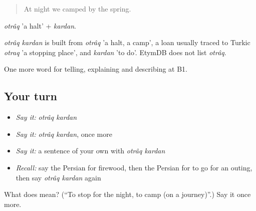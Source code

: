 \begin{quote}
At night we camped by the spring.
\end{quote}

\emph{otrâq} 'a halt' + \emph{kardan}.

\begin{cousinweb}
\emph{otrâq kardan} is built from \emph{otrâq} 'a halt, a camp', a loan usually traced to Turkic \emph{otraq} 'a stopping place', and \emph{kardan} 'to do'. EtymDB does not list \emph{otrâq}.
\end{cousinweb}

\begin{grammarlens}[title={What you've built}]
One more word for telling, explaining and describing at B1.
\end{grammarlens}

\subsection*{Your turn}
\begin{itemize}
\raggedright
  \item \emph{Say it:} \emph{otrâq kardan}
  \item \emph{Say it:} \emph{otrâq kardan}, once more
  \item \emph{Say it:} a sentence of your own with \emph{otrâq kardan}
  \item \emph{Recall:} say the Persian for firewood, then the Persian for to go for an outing, then say \emph{otrâq kardan} again
\end{itemize}

\begin{tcolorbox}[breakable,colback=teal!4,colframe=teal!35!black,title={Before you move on}]
What does   mean? (\textquotedblleft{}To stop for the night, to camp (on a journey)\textquotedblright{}.) Say it once more.
\end{tcolorbox}
